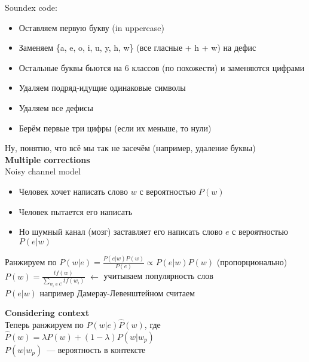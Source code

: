 \documentclass[12pt]{article}
\begin{document}
        \smallskip\smallskip
        Soundex code:
          \begin{itemize}
            \item Оставляем первую букву (in uppercase)
            \item Заменяем \{a, e, o, i, u, y, h, w\} (все гласные + h + w) на дефис
            \item Остальные буквы бьются на 6 классов (по похожести) и заменяются цифрами
            \item Удаляем подряд-идущие одинаковые символы
            \item Удаляем все дефисы
            \item Берём первые три цифры (если их меньше, то нули)
          \end{itemize}
        Ну, понятно, что всё мы так не засечём (например, удаление буквы)\\

      \pagebreak
      {\bf Multiple corrections}\\
        Noisy channel model
          \begin{itemize}
              \item Человек хочет написать слово $w$ с вероятностью $P(w)$
              \item Человек пытается его написать
              \item Но шумный канал (мозг) заставляет его написать слово $e$ с вероятностью $P(e | w)$
          \end{itemize}
      Ранжируем по $P(w | e) = \frac{P(e | w) P(w)}{P(e)} \propto P(e | w) P(w)$ (пропорционально)\\
      $P(w) = \frac{tf(w)}{\sum\limits_{w_i \in C} tf(w_i)}$ $\leftarrow$ учитываем популярность слов\\
      $P(e | w)$ например Дамерау-Левенштейном считаем

      \smallskip\smallskip
      {\bf Considering context}\\
      Теперь ранжируем по $P(w | e) \hat{P}(w)$, где $\hat{P}(w) = \lambda P(w) + (1 - \lambda)P(w | w_p)$\\
      $P(w | w_p)$~--- вероятность в контексте
\end{document}

